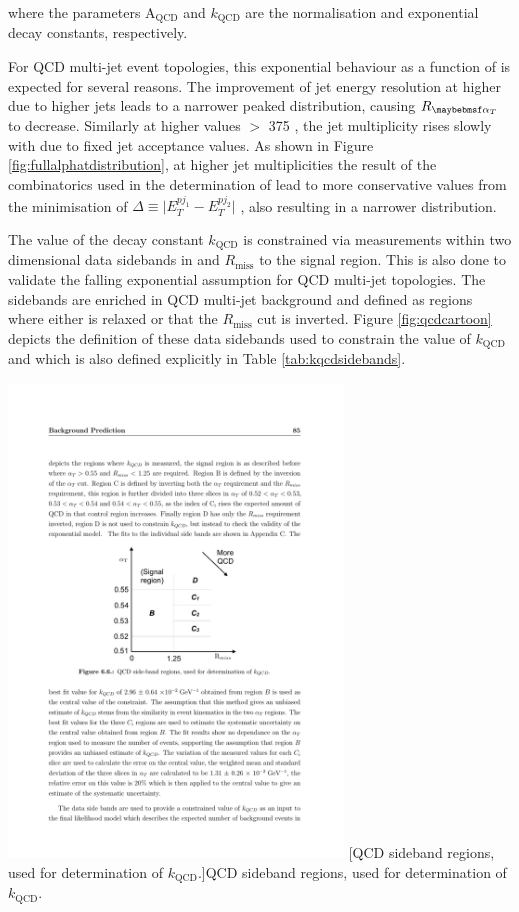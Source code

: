 where the parameters A$_{\text{QCD}}$ and $k_{\text{QCD}}$ are the normalisation and exponential decay constants, respectively. 

For QCD multi-jet event topologies, this exponential behaviour as a function of \theht is expected for several reasons. The improvement of jet energy resolution at higher \theht due to higher \pt jets leads to a narrower peaked \alphat distribution, causing $R_{\alphat}$ to decrease. Similarly at higher \theht values $>$ 375 \GeV, the jet multiplicity rises slowly with \theht due to fixed jet \pt acceptance values. As shown in Figure \ref{fig:fullalphatdistribution}, at higher jet multiplicities the result of the combinatorics used in the determination of \alphat lead to more conservative \alphat values from the minimisation of $\Delta$\theht $\equiv \lvert E_{T}^{pj_{1}} - E_{T}^{pj_{2}}\rvert$ , also resulting in a narrower distribution. 

The value of the decay constant $k_{\text{QCD}}$ is constrained via measurements within two dimensional data sidebands in \alphat and $R_{\text{miss}}$ to the signal region. This is also done to validate the falling exponential assumption for QCD multi-jet topologies. The sidebands are enriched in QCD multi-jet background and defined as regions where either \alphat is relaxed or that the $R_{\text{miss}}$ cut is inverted. Figure \ref{fig:qcdcartoon} depicts the definition of these data sidebands used to constrain the value of $k_{\text{QCD}}$ and which is also defined explicitly in Table \ref{tab:kqcdsidebands}.

\begin{minipage}{\linewidth}
\centering
\includegraphics[width = 3.5in]{plots/qcd_cartoon.pdf}
[QCD sideband regions, used for determination of $k_{\text{QCD}}$.]{QCD sideband regions, used for determination of $k_{\text{QCD}}$.}
\label{fig:qcdcartoon}
\end{minipage}

